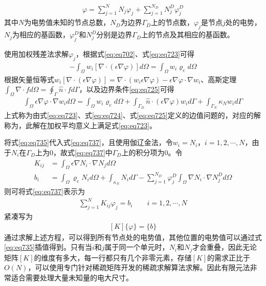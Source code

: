 \documentclass{article}
\numberwithin{equation}{section}
\begin{document}
\begin{align}
    \label{eq:eq735}
    \varphi=\sum_{j=1}^{N}N_j\varphi_j+\sum_{j=1}^{N_D}N_j^D\varphi_j^D
\end{align}
其中$N$为电势值未知的节点总数，$N_D$为边界$\Gamma_D$上的节点数，$\varphi_j$是节点$j$处的电势，$N_j$为相应的基函数，$\varphi_j^D$和$N_j^D$分别是边界$\Gamma_D$上的节点及其相应的基函数。\par
使用加权残差法求解$\varphi_j$，根据式\ref{eq:eq702}、式\ref{eq:eq723}可得
\begin{align}
    \label{eq:eq736}
    -\int_{\Omega}w_i[\nabla\cdot(\epsilon\nabla\varphi)]d\Omega=\int_{\Omega}w_i\varrho_ed\Omega
\end{align}
根据矢量恒等式$w_i[\nabla\cdot(\epsilon\nabla\varphi)]=\nabla\cdot(w_i\epsilon\nabla\varphi)-\epsilon\nabla\varphi\cdot\nabla w_i$、高斯定理$\int_{\Omega}\nabla\cdot fd\Omega=\oint_{\Gamma}\hat{n}\cdot fd\Gamma$，以及边界条件\ref{eq:eq725}可得
\begin{align}
    \label{eq:eq737}
    \int_{\Omega}\epsilon\nabla\varphi\cdot\nabla w_id\Omega=\int_{\Omega}w_i\varrho_ed\Omega+\int_{\Gamma_D}\hat{n}\cdot(\epsilon\nabla\varphi)w_id\Gamma+\int_{\Gamma_N}\kappa_Nw_id\Gamma
\end{align}
上式称为由式\ref{eq:eq723}、式\ref{eq:eq724}、式\ref{eq:eq725}定义的边值问题的\textbf{\color{blue}{弱式表达式}}，对应的解称为\textbf{\color{blue}{弱解}}，此解在加权平均意义上满足式\ref{eq:eq723}。\par
将式\ref{eq:eq735}代入式\ref{eq:eq737}，且使用伽辽金法，令$w_i=N_i$，$i=1,2,\cdots,N$，由于$N_i$在$\Gamma_D$上为0，故式\ref{eq:eq737}中$\Gamma_D$上的积分项为0。令
\begin{align}
    \label{eq:eq739}
    K_{ij}&=\int_{\Omega}\epsilon\nabla N_i\cdot\nabla N_jd\Omega \\
    b_i&=\int_{\Omega}\varrho_eN_id\Omega+\int_{\kappa_N}N_id\Gamma-\sum_{j=1}^{N_D}\varphi_j^D\int_{\Omega}\nabla N_i\cdot\nabla N_j^Dd\Omega
\end{align}
则可将式\ref{eq:eq737}表示为
\begin{align}
    \label{eq:eq762}
    \sum_{j=1}^{N}K_{ij}\varphi_j=b_i\qquad i=1,2,\cdots,N
\end{align}
紧凑写为
\begin{align}
    \label{eq:eq740}
    [K]\{\varphi\}=\{b\}
\end{align}
通过求解上述方程，可以得到所有节点处的电势值，其他位置的电势值可以通过式\ref{eq:eq735}插值得到。只有当$i$和$j$属于同一个单元时，$N_i$和$N_j$才会重叠，因此无论矩阵$[K]$的维度有多大，每一行都只有几个非零元素，存储$[K]$的需求正比于$O(N)$，可以使用专门针对稀疏矩阵开发的稀疏求解算法求解。因此有限元法非常适合需要处理大量未知量的电大尺寸。\par
\end{document}
